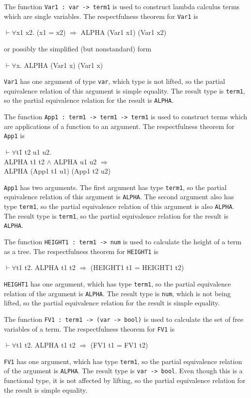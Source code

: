 \documentclass[envcountsame,runningheads]{llncs}
\newcommand{\quotient}{partial equivalence}
\begin{document}
The function {\tt Var1 : var -> term1} is used to construct
lambda calculus terms which are single variables. 
The respectfulness theorem for {\tt Var1} is
{\tt \begin{tabbing}
\hspace{5.5mm}
    $\vdash \forall$x1 x2. (x1 = x2) $\Rightarrow$ ALPHA (Var1 x1) (Var1 x2)
\end{tabbing}}
\pagebreak[2]
\noindent
or possibly the simplified (but nonstandard) form
{\tt \begin{tabbing}
\hspace{5.5mm}
    $\vdash \forall$x. ALPHA (Var1 x) (Var1 x)
\end{tabbing}}
{\tt Var1} has one argument of type {\tt var}, which type is not lifted,
so the \quotient{} relation of this argument is simple equality.
The result type is {\tt term1}, so the \quotient{} relation for the
result is {\tt ALPHA}. 

The function {\tt App1 : term1 -> term1 -> term1}
is used to construct terms which are applications of a function to an argument.
The respectfulness theorem for {\tt App1} is
{\tt \begin{tabbing}
\hspace{5.5mm}
    $\vdash \forall$t\=1 t2 u1 u2. \\
\>       ALPHA t1 t2 $\wedge$ ALPHA u1 u2 $\Rightarrow$\\
\>       ALPHA (App1 t1 u1) (App1 t2 u2)
\end{tabbing}}
{\tt App1} has two arguments.
The first argument has type {\tt term1},
so the \quotient{} relation of this argument is {\tt ALPHA}.
The second argument also has type {\tt term1},
so the \quotient{} relation of this argument is also {\tt ALPHA}.
The result type is {\tt term1}, so the \quotient{} relation for the
result is {\tt ALPHA}. 

The function {\tt HEIGHT1 : term1 -> num}
is used to calculate the height of a term as a tree.
The respectfulness theorem for {\tt HEIGHT1} is
{\tt \begin{tabbing}
\hspace{5.5mm}
    $\vdash \forall$t1 t2. ALPHA t1 t2 $\Rightarrow$ (HEIGHT1 t1 = HEIGHT1 t2)
\end{tabbing}}
{\tt HEIGHT1} has one argument, which
has type {\tt term1},
so the \quotient{} relation of the argument is {\tt ALPHA}.
The result type is {\tt num}, which is not being lifted,
so the \quotient{} relation for the result is simple equality. 

The function {\tt FV1 : term1 -> (var -> bool)}
is used to calculate the set of free variables of a term.
The respectfulness theorem for {\tt FV1} is
{\tt \begin{tabbing}
\hspace{5.5mm}
    $\vdash \forall$t1 t2. ALPHA t1 t2 $\Rightarrow$ (FV1 t1 = FV1 t2)
\end{tabbing}}
{\tt FV1} has one argument, which
has type {\tt term1},
so the \quotient{} relation of the argument is {\tt ALPHA}.
The result type is {\tt var -> bool}.
Even though this is a functional type,
it is not affected by lifting,
so the \quotient{} relation for the result is simple equality. 
\end{document}
